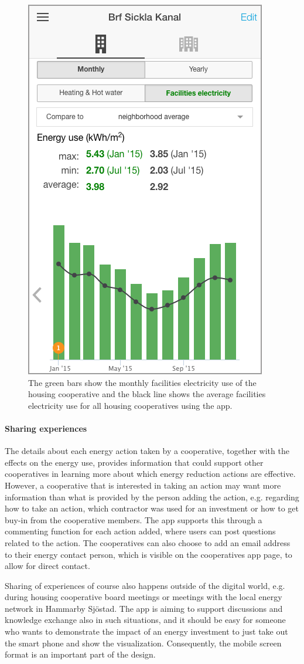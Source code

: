 \begin{figure}[h!]
	\centering
	\includegraphics[width=0.4\linewidth]{img/Figure204_Neighbourhood_average.png}
	\caption{The green bars show the monthly facilities electricity use of the housing cooperative and the black line shows the average facilities electricity use for all housing cooperatives using the app.}
	\label{fig:Figure204_Neighbourhood_average}
\end{figure}

\paragraph{Sharing experiences}

The details about each energy action taken by a cooperative, together with the effects on the energy use, provides information that could support other cooperatives in learning more about which energy reduction actions are effective. However, a cooperative that is interested in taking an action may want more information than what is provided by the person adding the action, e.g. regarding how to take an action, which contractor was used for an investment or how to get buy-in from the cooperative members. The app supports this through a commenting function for each action added, where users can post questions related to the action. The cooperatives can also choose to add an email address to their energy contact person, which is visible on the cooperatives app page, to allow for direct contact.

Sharing of experiences of course also happens outside of the digital world, e.g. during housing cooperative board meetings or meetings with the local energy network in Hammarby Sj{\"o}stad. The app is aiming to support discussions and knowledge exchange also in such situations, and it should be easy for someone who wants to demonstrate the impact of an energy investment to just take out the smart phone and show the visualization. Consequently, the mobile screen format is an important part of the design.
